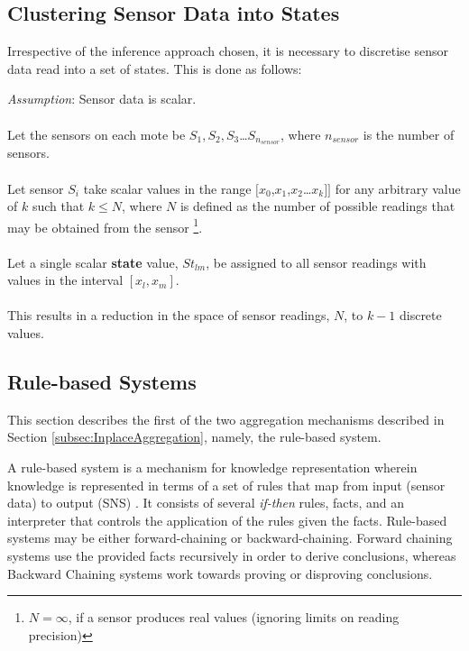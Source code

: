 \documentclass{sig-alternate-10pt}
\begin{document}
\subsection{Clustering Sensor Data into States} \label{subsubsec:Clustering}

Irrespective of the inference approach chosen, it is necessary to discretise
sensor data read into a set of states. This is done as follows:

\emph{Assumption}: Sensor data is scalar. \\ \\
\noindent
Let the sensors on each mote be $S_1, S_2, S_3$\ldots$S_{n_{sensor}}$, where
$n_{sensor}$ is the number of sensors.\\ \\
\noindent
Let sensor $S_i$ take scalar values in the range
$[x_0$,$x_1$,$x_2$\ldots$x_k]]$ for any arbitrary value of
$k$ such that $k \leq N$, where $N$ is
defined as the number of possible readings that may be obtained from the sensor \footnote{$N = \infty$, if a sensor produces real values (ignoring limits on reading
precision)}.\\ \\
\noindent
Let a single scalar \textbf{state} value, $St_{lm}$, be assigned to all sensor
readings with values in the interval $[x_l, x_m]$. \\ \\
\noindent
This results in a reduction in the space of sensor readings, $N$,
to $k-1$ discrete values.

\subsection{Rule-based Systems}

This section describes the first of the two aggregation mechanisms described in
Section \ref{subsec:InplaceAggregation}, namely, the rule-based system.

A rule-based system is a mechanism for knowledge representation wherein knowledge is
represented in terms of a set of rules that map from input (sensor
data) to output (SNS) \cite{RuleBasedAllison:2007,AIRichKnight:1990}. It
consists of several \emph{if-then} rules, facts, and an interpreter that controls the
application of the rules given the facts. Rule-based systems may be either
forward-chaining or backward-chaining. Forward chaining systems use the
provided facts recursively in order to derive conclusions, whereas Backward
Chaining systems work towards proving or disproving conclusions.
\end{document}
